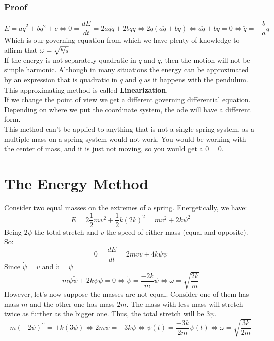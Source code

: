 \documentclass{report}
\begin{document}
        \subsubsection*{Proof}
        \[E=a\dot{q}^2+bq^2+c\Longleftrightarrow 0=\dfrac{dE}{dt}=2a\dot{q}\ddot{q}+2bq\dot{q}\Longleftrightarrow 2\dot{q}\left(a\ddot{q}+bq\right)\Longleftrightarrow a\ddot{q}+bq=0\Longleftrightarrow\boxed{\ddot{q}=-\dfrac{b}{a}q}\]
        \hspace{1.2cm}Which is our governing equation from which we have plenty of knowledge to affirm that $\omega=\sqrt{\nicefrac{b}{a}}$\\

        \noindent If the energy is not separately quadratic in $q$ and $\dot{q}$, then the motion will not be simple harmonic. Although in many situations the energy can be approximated by an expression that is quadratic in $q$ and $\dot{q}$ as it happens with the pendulum. This approximating method is called \textbf{Linearization}.\\

        \noindent If we change the point of view we get a different governing differential equation. Depending on where we put the coordinate system, the ode will have a different form.\\

        \noindent This method can't be applied to anything that is not a single spring system, as a multiple mass on a spring system would not work. You would be working with the center of mass, and it is just not moving, so you would get a $0=0$.\\

      \section{The Energy Method}
          \noindent Consider two equal masses on the extremes of a spring. Energetically, we have:
          \[E=2\dfrac{1}{2}mv^2+\dfrac12 k(2k)^2=mv^2+2k\psi^2\]
          \noindent Being $2\psi$ the total stretch and $v$ the speed of either mass (equal and opposite). So:
          \[0=\dfrac{dE}{dt}=2mv\dot{v}+4k\psi\dot{\psi}\]
          \noindent Since $\dot{\psi}=v$ and $\dot{v}=\ddot{\psi}$
          \[m\dot{\psi}\ddot{\psi}+2k\psi\dot{\psi}=0\Longleftrightarrow\ddot{\psi}=\dfrac{-2k}{m}\psi\Longleftrightarrow\boxed{\omega=\sqrt{\dfrac{2k}{m}}}\]
          \noindent However, let's now suppose the masses are not equal. Consider one of them has mass $m$ and the other one has mass $2m$. The mass with less mass will stretch twice as further as the bigger one. Thus, the total stretch will be $3\psi$.
          \[m(-2\psi)^{\prime\prime}=+k(3\psi)\Longleftrightarrow 2m\ddot{\psi}=-3k\psi\Longleftrightarrow\ddot{\psi}(t)=\dfrac{-3k}{2m}\psi(t)\Longleftrightarrow\boxed{\omega=\sqrt{\dfrac{3k}{2m}}}\]
\end{document}
